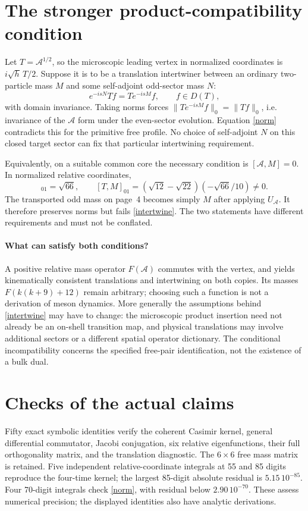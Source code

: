 \documentclass[11pt,a4paper]{article}
\newcommand{\Aop}{\mathcal A}
\begin{document}
\newpage
\section{The stronger product-compatibility condition}
Let $T=\Aop^{1/2}$, so the microscopic leading vertex in normalized
coordinates is $i\sqrt h\,T/2$. Suppose it is to be a translation
intertwiner between an ordinary two-particle mass $M$ and some
self-adjoint odd-sector mass $N$:
\begin{equation}
 e^{-isN}Tf=Te^{-isM}f,\qquad f\in D(T),\label{intertwine}
\end{equation}
with domain invariance. Taking norms forces
$\|Te^{-isM}f\|_0=\|Tf\|_0$, i.e. invariance of the $\Aop$ form under
the even-sector evolution. Equation \eqref{norm} contradicts this
for the primitive free profile. No choice of self-adjoint $N$ on this
closed target sector can fix that particular intertwining requirement.

Equivalently, on a suitable common core the necessary condition is
$[\Aop,M]=0$. In normalized relative coordinates,
\begin{equation}
 [\Aop,M]_{01}=\sqrt{66},\qquad
 [T,M]_{01}=(\sqrt{12}-\sqrt{22})(-\sqrt{66}/10)\ne0.
\end{equation}
The transported odd mass on page~4 becomes simply $M$ after applying
$U_{\Aop}$. It therefore preserves norms but fails \eqref{intertwine}.
The two statements have different requirements and must not be conflated.

\paragraph{What can satisfy both conditions?}
A positive relative mass operator $F(\Aop)$ commutes with the vertex,
and yields kinematically consistent translations and intertwining on
both copies. Its masses $F(k(k+9)+12)$ remain arbitrary; choosing such
a function is not a derivation of meson dynamics. More generally the
assumptions behind \eqref{intertwine} may have to change: the microscopic
product insertion need not already be an on-shell transition map, and
physical translations may involve additional sectors or a different
spatial operator dictionary. The conditional incompatibility concerns
the specified free-pair identification, not the existence of a bulk dual.

\section{Checks of the actual claims}
Fifty exact symbolic identities verify the coherent Casimir kernel,
general differential commutator, Jacobi conjugation, six relative
eigenfunctions, their full orthogonality matrix, and the translation
diagnostic. The $6\times6$ free mass matrix is retained.
Five independent relative-coordinate integrals at 55 and 85 digits
reproduce the four-time kernel; the largest 85-digit absolute residual
is $5.15\,10^{-85}$. Four 70-digit integrals check \eqref{norm}, with
residual below $2.90\,10^{-70}$. These assess numerical precision;
the displayed identities also have analytic derivations.
\end{document}
